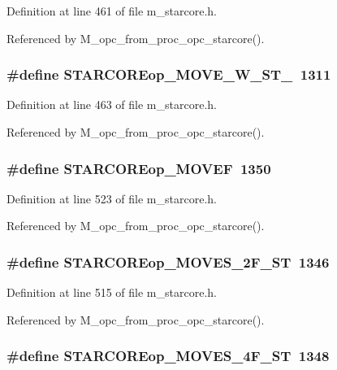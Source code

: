 Definition at line 461 of file m\_\-starcore.h.

Referenced by M\_\-opc\_\-from\_\-proc\_\-opc\_\-starcore().
\subsubsection{\setlength{\rightskip}{0pt plus 5cm}\#define STARCOREop\_\-MOVE\_\-W\_\-ST\_~1311}\label{m__starcore_8h_9303caa473c771bbc07090b9ddd3484c}




Definition at line 463 of file m\_\-starcore.h.

Referenced by M\_\-opc\_\-from\_\-proc\_\-opc\_\-starcore().
\subsubsection{\setlength{\rightskip}{0pt plus 5cm}\#define STARCOREop\_\-MOVEF~1350}\label{m__starcore_8h_7ea46c264bc08320cc672ab7fddfd6b7}




Definition at line 523 of file m\_\-starcore.h.

Referenced by M\_\-opc\_\-from\_\-proc\_\-opc\_\-starcore().
\subsubsection{\setlength{\rightskip}{0pt plus 5cm}\#define STARCOREop\_\-MOVES\_\-2F\_\-ST~1346}\label{m__starcore_8h_e67563be4dcca69d25b78d079c7c8103}




Definition at line 515 of file m\_\-starcore.h.

Referenced by M\_\-opc\_\-from\_\-proc\_\-opc\_\-starcore().
\subsubsection{\setlength{\rightskip}{0pt plus 5cm}\#define STARCOREop\_\-MOVES\_\-4F\_\-ST~1348}\label{m__starcore_8h_5f2c7687b8c60f5decb7a4bfed94823f}




